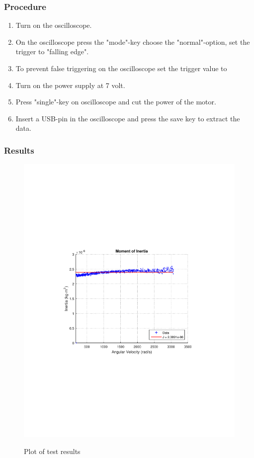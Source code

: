 \subsubsection{Procedure}

\begin{enumerate}
  \item Turn on the oscilloscope.
  \item On the oscilloscope press the "mode"-key choose the "normal"-option, set the trigger to "falling edge".
  \item To prevent false triggering on the oscilloscope set the trigger value to %
  \item Turn on the power supply at 7 volt.
  \item Press "single"-key on oscilloscope and cut the power of the motor.
  \item Insert a USB-pin in the oscilloscope and press the save key to extract the data.
\end{enumerate}

\subsubsection{Results}

\begin{figure}[H]
	\centering
	{
  	\includegraphics[width=\textwidth]{figures/momentOfInertia.pdf}
	}
	\caption{Plot of test results}
\end{figure}

